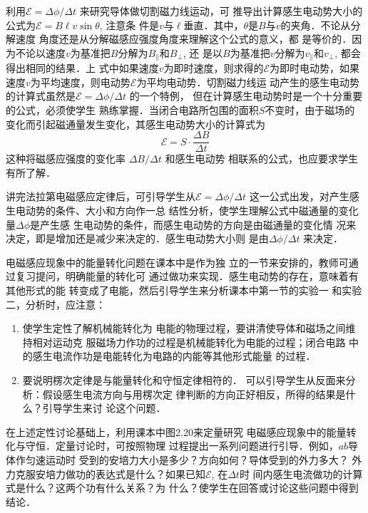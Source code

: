 利用$\mathcal{E}=\Delta\phi/\Delta t$
来研究导体做切割磁力线运动，可
推导出计算感生电动势大小的公式为$\mathcal{E}=B\ell v\sin\theta$, 注意条
件是$v$与$\ell$垂直．其中，$\theta$是$B$与$v$的夹角．不论从分解速度
角度还是从分解磁感应强度角度来理解这个公式的意义，都
是等价的．因为不论以速度$v$为基准把$B$分解为$B_{\parallel}$和$B_{\bot}$, 还
是以$B$为基准把$v$分解为$v_{\parallel}$和$v_{\bot}$, 都会得出相同的结果．上
式中如果速度$v$为即时速度，则求得的$\mathcal{E}$为即时电动势，如果
速度$v$为平均速度，则电动势$\mathcal{E}$为平均电动势．切割磁力线运
动产生的感生电动势的计算式虽然是$\mathcal{E}=\Delta\phi/\Delta t$
的一个特例，
但在计算感生电动势时是一个十分重要的公式，必须使学生
熟练掌握．当闭合电路所包围的面积$S$不变时，由于磁场的
变化而引起磁通量发生变化，其感生电动势大小的计算式为
\[\mathcal{E}=S\cdot \frac{\Delta B}{\Delta t}\]
这种将磁感应强度的变化率
$\Delta B/\Delta t$
和感生电动势
相联系的公式，也应要求学生有所了解．

讲完法拉第电磁感应定律后，可引导学生从$\mathcal{E}=\Delta\phi/\Delta t$
这一公式出发，对产生感生电动势的条件、大小和方向作一总
结性分析，使学生理解公式中磁通量的变化量$\Delta\phi$是产生感
生电动势的条件，而感生电动势的方向是由磁通量的变化情
况来决定，即是增加还是减少来决定的．感生电动势大小则
是由$\Delta\phi/\Delta t$
来决定．

电磁感应现象中的能量转化问题在课本中是作为独
立的一节来安排的，教师可通过复习提问，明确能量的转化可
通过做功来实现．感生电动势的存在，意味着有其他形式的能
转变成了电能，然后引导学生来分析课本中第一节的实验一
和实验二，分析时，应注意：
\begin{enumerate}
\item 使学生定性了解机械能转化为
电能的物理过程，要讲清使导体和磁场之间维持相对运动克
服磁场力作功的过程是机械能转化为电能的过程；闭合电路
中的感生电流作功是电能转化为电路的内能等其他形式能量
的过程．
\item 要说明楞次定律是与能量转化和守恒定律相符的．
可以引导学生从反面来分析：假设感生电流方向与用楞次定
律判断的方向正好相反，所得的结果是什么？引导学生来讨
论这个问题．
\end{enumerate}


在上述定性讨论基础上，利用课本中图2.20来定量研究
电磁感应现象中的能量转化与守恒．定量讨论时，可按照物理
过程提出一系列问题进行引导．例如，$ab$导体作匀速运动时
受到的安培力大小是多少？方向如何？导体受到的外力多大？
外力克服安培力做功的表达式是什么？如果已知$\mathcal{E}$, 在$\Delta t$时
间内感生电流做功的计算式是什么？这两个功有什么关系？为
什么？使学生在回答或讨论这些问题中得到结论．

